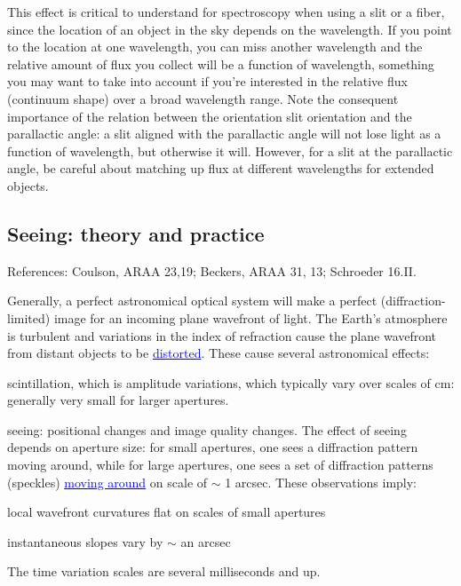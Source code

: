 \documentclass[12pt]{article}
\begin{document}
This effect is critical to understand for spectroscopy when using a
slit or a fiber, since the location of an object in the sky depends on
the wavelength. If you point to the location at one wavelength, you
can miss another wavelength and the relative amount of flux you
collect will be a function of wavelength, something you may want to
take into account if you're interested in the relative flux (continuum
shape) over a broad wavelength range. Note the consequent importance
of the relation between the orientation slit orientation and the
parallactic angle: a slit aligned with the parallactic angle will not
lose light as a function of wavelength, but otherwise it will.
However, for a slit at the parallactic angle, be careful about
matching up flux at different wavelengths for extended objects.
\subsection*{Seeing: theory and practice}
References: Coulson, ARAA 23,19; Beckers, ARAA 31, 13; Schroeder
16.II.

Generally, a perfect astronomical optical system will make a perfect
(diffraction-limited) image for an incoming plane wavefront of light.
The Earth's atmosphere is turbulent and variations in the index of
refraction cause the plane wavefront from distant objects to be
\href{http://astronomy.nmsu.edu/holtz/a535/html/diagrams/a535/seeing.htm}
{\textcolor{blue}{distorted}}.
These cause several astronomical effects:
\begin{itemize*}
    \item scintillation, which is amplitude variations, which
    typically vary over scales of cm: generally very small for larger
    apertures.
    \item seeing: positional changes and image quality
    changes. The effect of seeing depends on aperture size: for small
    apertures, one sees a diffraction pattern moving around, while for
    large apertures, one sees a set of diffraction patterns (speckles)
    \href{https://en.wikipedia.org/wiki/Speckle_imaging#/media/File:Eps_aql_movie_not_2000.gif}
    {\textcolor{blue}{moving around}}
    on scale of $\sim$ 1 arcsec. These observations
    imply:
    \begin{itemize*}
        \item local wavefront curvatures flat on scales of small
        apertures
        \item instantaneous slopes vary by $\sim$ an arcsec
    \end{itemize*}
\end{itemize*}
The time variation scales are several milliseconds and up.
\end{document}
